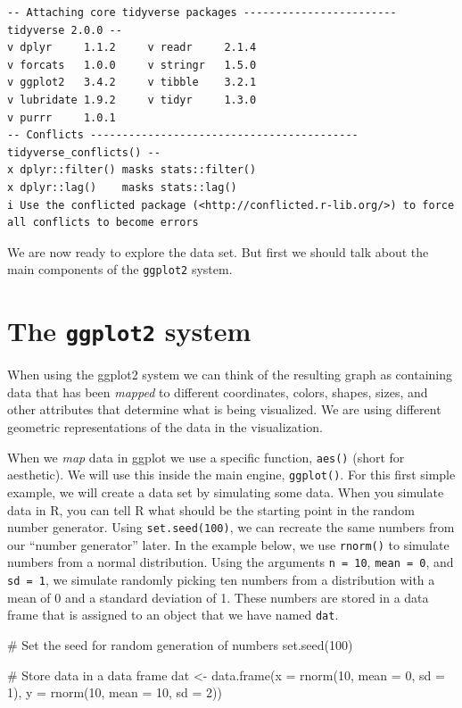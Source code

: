 \documentclass[
  11pt,
  letterpaper,
]{scrbook}
\newenvironment{Shaded}{\begin{snugshade}}{\end{snugshade}}
\newcommand{\AttributeTok}[1]{\textcolor[rgb]{0.40,0.45,0.13}{#1}}
\newcommand{\CommentTok}[1]{\textcolor[rgb]{0.37,0.37,0.37}{#1}}
\newcommand{\DecValTok}[1]{\textcolor[rgb]{0.68,0.00,0.00}{#1}}
\newcommand{\FunctionTok}[1]{\textcolor[rgb]{0.28,0.35,0.67}{#1}}
\newcommand{\NormalTok}[1]{\textcolor[rgb]{0.00,0.23,0.31}{#1}}
\newcommand{\OtherTok}[1]{\textcolor[rgb]{0.00,0.23,0.31}{#1}}
\begin{document}
\begin{verbatim}
-- Attaching core tidyverse packages ------------------------ tidyverse 2.0.0 --
v dplyr     1.1.2     v readr     2.1.4
v forcats   1.0.0     v stringr   1.5.0
v ggplot2   3.4.2     v tibble    3.2.1
v lubridate 1.9.2     v tidyr     1.3.0
v purrr     1.0.1     
-- Conflicts ------------------------------------------ tidyverse_conflicts() --
x dplyr::filter() masks stats::filter()
x dplyr::lag()    masks stats::lag()
i Use the conflicted package (<http://conflicted.r-lib.org/>) to force all conflicts to become errors
\end{verbatim}

We are now ready to explore the data set. But first we should talk about
the main components of the \texttt{ggplot2} system.

\hypertarget{the-ggplot2-system}{%
\section{\texorpdfstring{The \texttt{ggplot2}
system}{The ggplot2 system}}\label{the-ggplot2-system}}

When using the ggplot2 system we can think of the resulting graph as
containing data that has been \emph{mapped} to different coordinates,
colors, shapes, sizes, and other attributes that determine what is being
visualized. We are using different geometric representations of the data
in the visualization.

When we \emph{map} data in ggplot we use a specific function,
\texttt{aes()} (short for aesthetic). We will use this inside the main
engine, \texttt{ggplot()}. For this first simple example, we will create
a data set by simulating some data. When you simulate data in R, you can
tell R what should be the starting point in the random number generator.
Using \texttt{set.seed(100)}, we can recreate the same numbers from our
``number generator'' later. In the example below, we use
\texttt{rnorm()} to simulate numbers from a normal distribution. Using
the arguments \texttt{n\ =\ 10}, \texttt{mean\ =\ 0}, and
\texttt{sd\ =\ 1}, we simulate randomly picking ten numbers from a
distribution with a mean of 0 and a standard deviation of 1. These
numbers are stored in a data frame that is assigned to an object that we
have named \texttt{dat}.

\begin{Shaded}
\begin{Highlighting}[numbers=left,,]
\CommentTok{\# Set the seed for random generation of numbers}
\FunctionTok{set.seed}\NormalTok{(}\DecValTok{100}\NormalTok{)}

\CommentTok{\# Store data in a data frame}
\NormalTok{dat }\OtherTok{\textless{}{-}} \FunctionTok{data.frame}\NormalTok{(}\AttributeTok{x =} \FunctionTok{rnorm}\NormalTok{(}\DecValTok{10}\NormalTok{, }\AttributeTok{mean =} \DecValTok{0}\NormalTok{, }\AttributeTok{sd =} \DecValTok{1}\NormalTok{), }
                  \AttributeTok{y =} \FunctionTok{rnorm}\NormalTok{(}\DecValTok{10}\NormalTok{, }\AttributeTok{mean =} \DecValTok{10}\NormalTok{, }\AttributeTok{sd =} \DecValTok{2}\NormalTok{))}
\end{Highlighting}
\end{Shaded}
\end{document}
